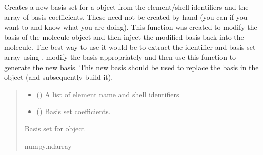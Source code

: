 \documentclass[letterpaper,10pt,english]{sphinxmanual}
\begin{document}
\begin{fulllineitems}
\label{\detokenize{api:MSTOOptpar.putcoeffs}}
\pysigstartsignatures
\pysiglinewithargsret
{}
{\sphinxparamcomma {}}
{}
\pysigstopsignatures
\sphinxAtStartPar
Creates a new basis set for a  object from the element/shell identifiers and the array of basis coefficients. These need not be created by hand (you can if you want to and know what you are doing). This function was created to modify the basis of the molecule object and then inject the modified basis back into the molecule. The best way to use it would be to extract the identifier and basis set array using , modify the basis appropriately and then use this function to generate the new basis. This new basis should be used to replace the basis in the  object (and subsequently build it).
\begin{quote}\begin{description}
\begin{itemize}
\item {} 
\sphinxAtStartPar
{} () \textendash{} A list of element name and shell identifiers

\item {} 
\sphinxAtStartPar
{} () \textendash{} Basis set coefficients.

\end{itemize}

\sphinxAtStartPar
Basis set for  object

\sphinxAtStartPar
numpy.ndarray

\end{description}\end{quote}


\end{fulllineitems}
\end{document}

